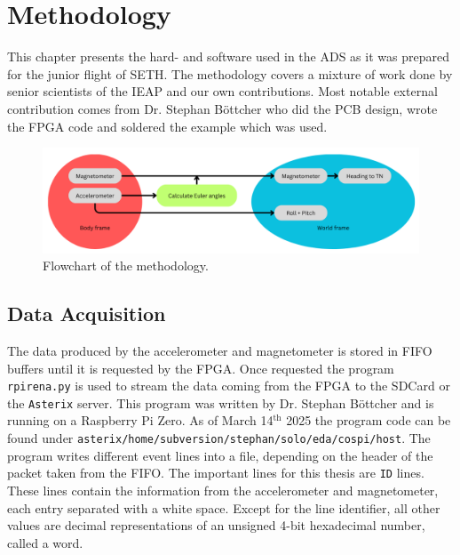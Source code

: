 \chapter{Methodology \label{ch:methodology}}
This chapter presents the hard- and software used in the \ac{ADS} as it was prepared for the junior flight of \ac{SETH}. The methodology covers a mixture of work done by senior scientists of the \ac{IEAP} and our own contributions. Most notable external contribution comes from Dr. Stephan Böttcher who did the \ac{PCB} design, wrote the \ac{FPGA} code and soldered the example which was used. 

\begin{figure}[H]
    \centering
    \includegraphics[width=0.75\linewidth]{images/02_methodology/ads_flowchart.png}
    \caption{Flowchart of the methodology.}
    \label{fig:meth:ads_flowchart}
\end{figure}

\section{Data Acquisition \label{sec:meth:data_acquisition}}
The data produced by the accelerometer and magnetometer is stored in \ac{FIFO} buffers until it is requested by the \ac{FPGA}. Once requested the program \verb|rpirena.py| is used to stream the data coming from the \ac{FPGA} to the SD\:Card or the \verb|Asterix| server. This program was written by Dr. Stephan Böttcher and is running on a Raspberry Pi Zero. As of March 14$^\mathrm{th}$ 2025 the program code can be found under \verb|asterix/home/subversion/stephan/solo/eda/cospi/host|. The program writes different event lines into a file, depending on the header of the packet taken from the \ac{FIFO}. The important lines for this thesis are \verb|ID| lines. These lines contain the information from the accelerometer and magnetometer, each entry separated with a white space. Except for the line identifier, all other values are decimal representations of an unsigned 4-bit hexadecimal number, called a word.

